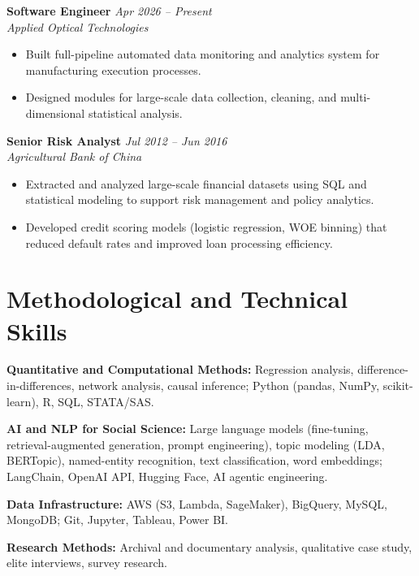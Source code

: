 \documentclass[11pt, letterpaper]{article}
\begin{document}
\vspace{6pt}
\noindent\textbf{Software Engineer}
\hfill \textit{Apr 2026 -- Present}\\
\textit{Applied Optical Technologies}
\begin{itemize}
  \item Built full-pipeline automated data monitoring and analytics system
        for manufacturing execution processes.
  \item Designed modules for large-scale data collection, cleaning, and
        multi-dimensional statistical analysis.
\end{itemize}

\vspace{6pt}
\noindent\textbf{Senior Risk Analyst}
\hfill \textit{Jul 2012 -- Jun 2016}\\
\textit{Agricultural Bank of China}
\begin{itemize}
  \item Extracted and analyzed large-scale financial datasets using SQL and
        statistical modeling to support risk management and policy analytics.
  \item Developed credit scoring models (logistic regression, WOE binning)
        that reduced default rates and improved loan processing efficiency.
\end{itemize}

\section{Methodological and Technical Skills}

\noindent\textbf{Quantitative and Computational Methods:}
Regression analysis, difference-in-differences, network analysis,
causal inference; Python (pandas, NumPy, scikit-learn), R, SQL, STATA/SAS.

\noindent\textbf{AI and NLP for Social Science:}
Large language models (fine-tuning, retrieval-augmented generation,
prompt engineering), topic modeling (LDA, BERTopic), named-entity recognition,
text classification, word embeddings; LangChain, OpenAI API, Hugging Face, AI agentic engineering.

\noindent\textbf{Data Infrastructure:}
AWS (S3, Lambda, SageMaker), BigQuery, MySQL, MongoDB; Git, Jupyter,
Tableau, Power BI.

\noindent\textbf{Research Methods:}
Archival and documentary analysis, qualitative case study, elite
interviews, survey research.
\end{document}
